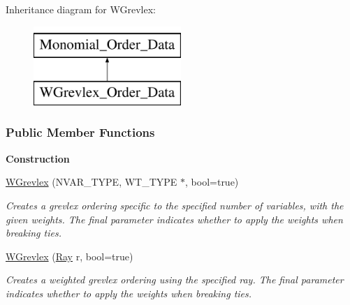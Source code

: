 Inheritance diagram for W\+Grevlex\+:\begin{figure}[H]
\begin{center}
\leavevmode
\includegraphics[height=3.000000cm]{group__orderinggroup}
\end{center}
\end{figure}
\subsubsection*{Public Member Functions}
\begin{Indent}\textbf{ Construction}\par
\begin{DoxyCompactItemize}
\item 
\mbox{\label{group__orderinggroup_a0ac3e66fb20c098427f6a08c92fd3771}} 
\hyperlink{group__orderinggroup_a0ac3e66fb20c098427f6a08c92fd3771}{W\+Grevlex} (N\+V\+A\+R\+\_\+\+T\+Y\+PE, W\+T\+\_\+\+T\+Y\+PE $\ast$, bool=true)
\begin{DoxyCompactList}\small\item\em Creates a grevlex ordering specific to the specified number of variables, with the given weights. The final parameter indicates whether to apply the weights when breaking ties. \end{DoxyCompactList}\item 
\mbox{\label{group__orderinggroup_a60f58ee49c04e416085a096c4e5798c1}} 
\hyperlink{group__orderinggroup_a60f58ee49c04e416085a096c4e5798c1}{W\+Grevlex} (\hyperlink{group___c_l_s_solvers_class_l_p___solvers_1_1_ray}{Ray} r, bool=true)
\begin{DoxyCompactList}\small\item\em Creates a weighted grevlex ordering using the specified ray. The final parameter indicates whether to apply the weights when breaking ties. \end{DoxyCompactList}\end{DoxyCompactItemize}
\end{Indent}
